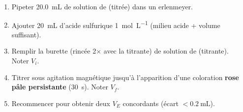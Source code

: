\documentclass[11pt]{article}
\begin{document}
\begin{methode}
\begin{enumerate}
  \item Pipeter \SI{20,0}{\milli\liter} de solution de  (titrée) dans un erlenmeyer.
  \item Ajouter \SI{20}{\milli\liter} d'acide sulfurique \SI{1}{\mole\per\liter} (milieu acide + volume suffisant).
  \item Remplir la burette (rincée 2$\times$ avec la titrante) de solution de  (titrante). Noter $V_i$.
  \item Titrer sous agitation magnétique jusqu'à l'apparition d'une coloration \textbf{rose pâle persistante} (\SI{30}{\second}). Noter $V_f$.
  \item Recommencer pour obtenir deux $V_E$ concordants (écart $< \SI{0,2}{\milli\liter}$).
\end{enumerate}
\end{methode}
\end{document}
